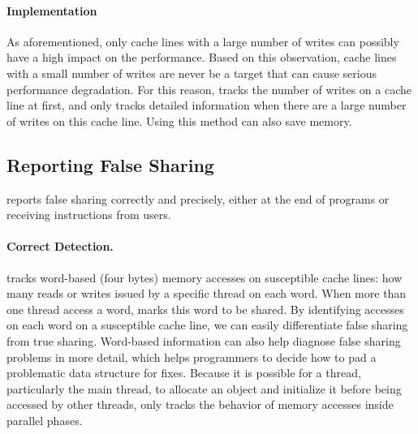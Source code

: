 
\paragraph{Implementation} 
As aforementioned, only cache lines with a large number of writes can possibly have a high impact on the performance. Based on this observation, cache lines with a small number of writes are never be a target that can cause serious performance degradation. For this reason, \Cheetah{} tracks the number of writes on a cache line at first, and only tracks detailed information when there are a large number of writes on this cache line. Using this method can also save memory. 

 \subsection{Reporting False Sharing}
\label{sec:report}

\Cheetah{} reports false sharing correctly and precisely, either at the end of programs or receiving instructions from users.  

\paragraph{Correct Detection.} \Cheetah{} tracks word-based (four bytes) memory accesses on susceptible cache lines: how many reads or writes issued by a specific thread on each word. When more than one thread access a word, \Cheetah{} marks this word to be shared. By identifying accesses on each word on a susceptible cache line, we can easily differentiate false sharing from true sharing. Word-based information can also help diagnose false sharing problems in more detail, which helps programmers to decide how to pad a problematic data structure for fixes. Because it is possible for a thread, particularly the main thread, to allocate an object and initialize it before being accessed by other threads, \cheetah{} only tracks the behavior of memory accesses inside parallel phases.

